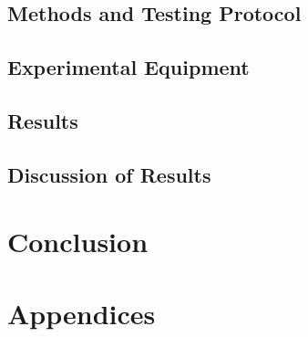 \documentclass[amsmath, amssymb, aps, pra, 12pt]{revtex4-1}
\begin{document}
\subsection{\label{sec:testing}Methods and Testing Protocol}


\subsection{\label{sec:equipment}Experimental Equipment}


\subsection{\label{sec:results}Results}


\subsection{\label{sec:resultdiscussion}Discussion of Results}


\section{\label{sec:conclusion}Conclusion}


\section{\label{sec:appendices}Appendices}



\end{document}
